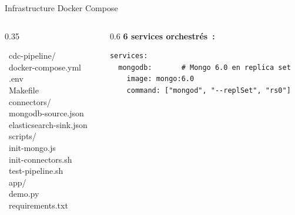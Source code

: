 \documentclass[aspectratio=169]{beamer}
\begin{document}
\begin{frame}[fragile]{Infrastructure Docker Compose}
  \begin{columns}[T]
    \begin{column}{0.35\textwidth}
      \begin{tcolorbox}[card, title={\faFolderOpen\ Structure du Projet}]
        \ttfamily\scriptsize
        \textcolor{accent}{\faFolderOpen\ cdc-pipeline/}\\
        \hspace*{0.4cm}\textcolor{success}{\faDocker\ docker-compose.yml}\\
        \hspace*{0.4cm}\faFileAlt\ .env\\
        \hspace*{0.4cm}\faFileAlt\ Makefile\\
        \hspace*{0.4cm}\textcolor{textsec}{\faFolder\ connectors/}\\
        \hspace*{0.8cm}\faFileCode\ mongodb-source.json\\
        \hspace*{0.8cm}\faFileCode\ elasticsearch-sink.json\\
        \hspace*{0.4cm}\textcolor{textsec}{\faFolder\ scripts/}\\
        \hspace*{0.8cm}\faTerminal\ init-mongo.js\\
        \hspace*{0.8cm}\faTerminal\ init-connectors.sh\\
        \hspace*{0.8cm}\faTerminal\ test-pipeline.sh\\
        \hspace*{0.4cm}\textcolor{textsec}{\faFolder\ app/}\\
        \hspace*{0.8cm}\faPython\ demo.py\\
        \hspace*{0.8cm}\faFileAlt\ requirements.txt
      \end{tcolorbox}
    \end{column}
    \begin{column}{0.6\textwidth}
      \textbf{\color{accent} 6 services orchestrés~:}
      \begin{tcolorbox}[codebox]
\begin{verbatim}
services:
  mongodb:       # Mongo 6.0 en replica set
    image: mongo:6.0
    command: ["mongod", "--replSet", "rs0"]


\end{verbatim}
\end{tcolorbox}
\end{column}
\end{columns}
\end{frame}
\end{document}
